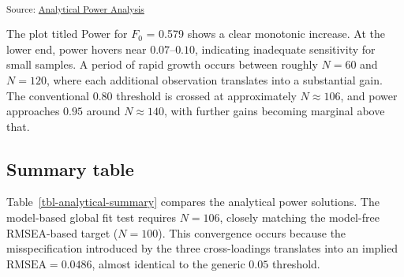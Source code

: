 \documentclass[
  letterpaper,
  DIV=11,
  numbers=noendperiod]{scrartcl}
\begin{document}
\textsubscript{Source:
\href{https://phdpablo.github.io/cfa-power/Scripts/AnalysisScripts/02_analytical_power-preview.html\#cell-fig-power-popmodel}{Analytical
Power Analysis}}

The plot titled Power for \(F_0\) = 0.579 shows a clear monotonic
increase. At the lower end, power hovers near \(0.07\)--\(0.10\),
indicating inadequate sensitivity for small samples. A period of rapid
growth occurs between roughly \(N = 60\) and \(N = 120\), where each
additional observation translates into a substantial gain. The
conventional \(0.80\) threshold is crossed at approximately
\(N \approx 106\), and power approaches \(0.95\) around
\(N \approx 140\), with further gains becoming marginal above that.

\subsection{Summary table}\label{summary-table}

Table~\ref{tbl-analytical-summary} compares the analytical power
solutions. The model-based global fit test requires \(N = 106\), closely
matching the model-free RMSEA-based target (\(N = 100\)). This
convergence occurs because the misspecification introduced by the three
cross-loadings translates into an implied \(\text{RMSEA} = 0.0486\),
almost identical to the generic \(0.05\) threshold.
\end{document}
